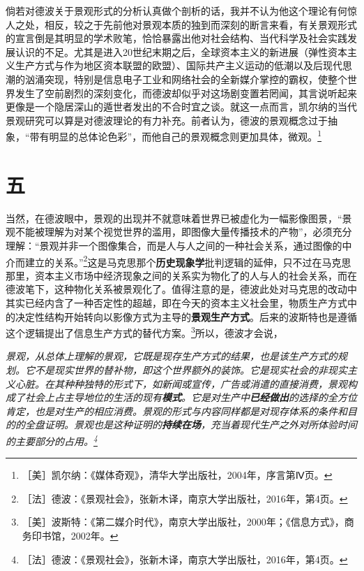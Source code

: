 \documentclass[fontset=fandol, a4paper, 12pt, openright]{ctexbook}
\renewenvironment{quote}
  {\list{}{\rightmargin\leftmargin}%
   \item\relax\small\itshape\color{darkgray}}
  {\endlist}
\begin{document}
倘若对德波关于景观形式的分析认真做个剖析的话，我并不认为他这个理论有何惊人之处，相反，较之于先前他对景观本质的独到而深刻的断言来看，有关景观形式的宣言倒是其明显的学术败笔，恰恰暴露出他对社会结构、当代科学及社会实践发展认识的不足。尤其是进入20世纪末期之后，全球资本主义的新进展（弹性资本主义生产方式与作为地区资本联盟的欧盟）、国际共产主义运动的低潮以及后现代思潮的汹涌突现，特别是信息电子工业和网络社会的全新媒介掌控的霸权，使整个世界发生了空前剧烈的深刻变化，而德波却似乎对这场剧变置若罔闻，其言说听起来更像是一个隐居深山的遁世者发出的不合时宜之谈。{\kaishu 就这一点而言，凯尔纳的当代景观研究可以算是对德波理论的有力补充。前者认为，德波的景观概念过于抽象，“带有明显的总体论色彩”，而他自己的景观概念则更加具体，微观。\footnote{［美］凯尔纳：《媒体奇观》，清华大学出版社，2004年，序言第Ⅳ页。}}

\section*{五}

当然，在德波眼中，景观的出现并不就意味着世界已被虚化为一幅影像图景，“景观不能被理解为对某个视觉世界的滥用，即图像大量传播技术的产物”，必须充分理解：“景观并非一个图像集合，而是人与人之间的一种社会关系，通过图像的中介而建立的关系。”\footnote{［法］德波：《景观社会》，张新木译，南京大学出版社，2016年，第4页。}这是马克思那个\textbf{历史现象学}批判逻辑的延伸，只不过在马克思那里，资本主义市场中经济现象之间的关系实为物化了的人与人的社会关系，而在德波笔下，这种物化关系被景观化了。值得注意的是，德波此处对马克思的改动中其实已经内含了一种否定性的超越，即在今天的资本主义社会里，物质生产方式中的决定性结构开始转向以影像方式为主导的\textbf{景观生产方式}。后来的波斯特也是遵循这个逻辑提出了信息生产方式的替代方案。\footnote{［美］波斯特：《第二媒介时代》，南京大学出版社，2000年；《信息方式》，商务印书馆，2002年。}所以，德波才会说，

\begin{quote}
景观，从总体上理解的景观，它既是现存生产方式的结果，也是该生产方式的规划。它不是现实世界的替补物，即这个世界额外的装饰。它是现实社会的非现实主义心脏。在其种种独特的形式下，如新闻或宣传，广告或消遣的直接消费，景观构成了社会上占主导地位的生活的现有\textbf{模式}。它是对生产中\textbf{已经做出}的选择的全方位肯定，也是对生产的相应消费。景观的形式与内容同样都是对现存体系的条件和目的的全盘证明。景观也是这种证明的\textbf{持续在场}，充当着现代生产之外对所体验时间的主要部分的占用。\footnote{［法］德波：《景观社会》，张新木译，南京大学出版社，2016年，第4页。}
\end{quote}
\end{document}
